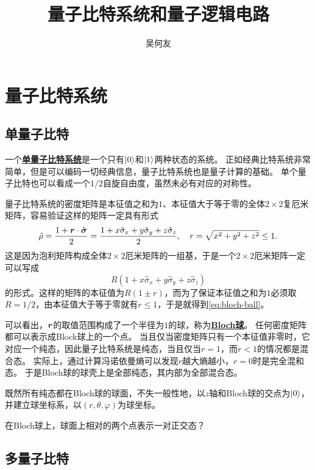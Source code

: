 \documentclass[hyperref, UTF8, a4paper]{ctexart}
\title{量子比特系统和量子逻辑电路}
\author{吴何友}
\newcommand*{\concept}[1]{\underline{\textbf{#1}}}
\begin{document}
\maketitle

\section{量子比特系统}

\subsection{单量子比特}

一个\concept{单量子比特系统}是一个只有$\ket{0}$和$\ket{1}$两种状态的系统。
正如经典比特系统非常简单，但是可以编码一切经典信息，量子比特系统也是量子计算的基础。
单个量子比特也可以看成一个$1/2$自旋自由度，虽然未必有对应的对称性。

量子比特系统的密度矩阵是本征值之和为$1$、本征值大于等于零的全体$2 \times 2$复厄米矩阵，容易验证这样的矩阵一定具有形式
\begin{equation}
    \hat{\rho} = \frac{1 + \vb*{r} \cdot \hat{\vb*{\sigma}}}{2} = \frac{1 + x \hat{\sigma}_x + y \hat{\sigma}_y + z \hat{\sigma}_z}{2}, \quad r = \sqrt{x^2+y^2+z^2} \leq 1.
    \label{eq:bloch-ball}
\end{equation}
这是因为泡利矩阵构成全体$2\times 2$厄米矩阵的一组基，于是一个$2\times 2$厄米矩阵一定可以写成
\[
    R(1 + x \hat{\sigma}_x + y \hat{\sigma}_y + z \hat{\sigma}_z)
\]
的形式。这样的矩阵的本征值为$R(1 \pm r)$，而为了保证本征值之和为$1$必须取$R=1/2$，由本征值大于等于零就有$r\leq 1$，于是就得到\eqref{eq:bloch-ball}。

可以看出，$\vb*{r}$的取值范围构成了一个半径为$1$的球，称为\concept{Bloch球}。
任何密度矩阵都可以表示成Block球上的一个点。
当且仅当密度矩阵只有一个本征值非零时，它对应一个纯态，因此量子比特系统是纯态，当且仅当$r=1$，而$r<1$的情况都是混合态。
实际上，通过计算冯诺依曼熵可以发现$r$越大熵越小，$r=0$时是完全混和态。
于是Bloch球的球壳上是全部纯态，其内部为全部混合态。

既然所有纯态都在Bloch球的球面，不失一般性地，以$z$轴和Bloch球的交点为$\ket{0}$，并建立球坐标系，以$(r, \theta, \varphi)$为球坐标。

在Bloch球上，球面上相对的两个点表示一对正交态？

\subsection{多量子比特}
\end{document}
